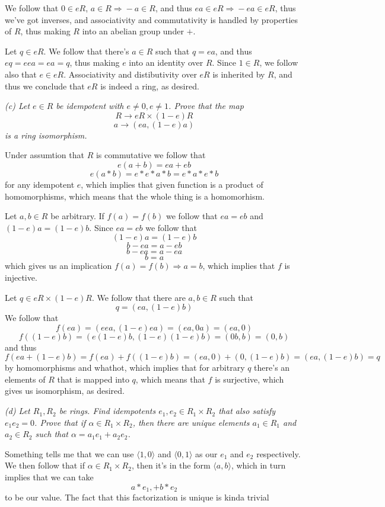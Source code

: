 \documentclass[11pt,oneside,titlepage]{book}
\DeclareMathOperator \ra {\Rightarrow}
\newcommand{\eangle}[1]{\langle #1 \rangle}
\begin{document}
We follow that $0 \in eR$, $a \in R \ra -a \in R$, and thus $ea \in eR
\ra -ea \in eR$, thus we've got inverses, and associativity and
commutativity is handled by properties of $R$, thus making $R$ into an
abelian group under $+$.

Let $q \in eR$. We follow that there's $a \in R$ such that $q = ea$,
and thus $eq = eea = ea = q$, thus making $e$ into an identity over
$R$. Since $1 \in R$, we follow also that $e \in eR$. Associativity
and distibutivity over $eR$ is inherited by $R$, and thus we conclude that
$eR$ is indeed a ring, as desired.

\textit{(c) Let $e \in R$ be idempotent with $e \neq 0, e \neq
1$. Prove that the map
  $$R \to eR \times (1 - e)R$$
  $$a \to (ea, (1 - e)a)$$
  is a ring isomorphism.}

Under assumtion that $R$ is commutative we follow that
$$ e (a + b) = e a + eb $$
$$ e (a * b) = e * e * a * b = e * a * e * b $$
for any idempotent $e$, which implies that given function is a product
of homomorphisms, which means that the whole thing is a homomorhism.

Let $a, b \in R$ be arbitrary.  If $f(a) = f(b)$ we follow that $ea =
eb$ and $(1 - e)a = (1 - e)b$.  Since $ea = eb$ we follow that
$$(1 - e)a = (1 - e)b$$
$$b - ea = a - eb$$
$$b - ea = a - ea$$
$$b = a$$
which gives us an implication $f(a) = f(b) \ra a = b$, which implies
that $f$ is injective.

Let $q \in eR \times (1 - e)R$. We follow that there are $a, b \in R$
such that
$$q = (ea, (1 - e)b)$$
We follow that
$$f(ea) = (eea, (1 - e)ea) = (ea, 0a) = (ea, 0)$$
$$f((1 - e)b) = (e(1 - e)b, (1 - e)(1 - e)b) = (0 b, b) = (0, b)$$
and thus
$$f(ea + (1 - e)b) = f(ea) + f((1 - e)b)
= (ea, 0) + (0, (1 - e)b) = (ea, (1 - e)b) = q$$
by homomorphisms and whathot, which implies that for arbitrary $q$
there's an elements of $R$ that is mapped into $q$, which means that
$f$ is surjective, which gives us isomorphism, as desired.

\textit{(d) Let $R_1, R_2$ be rings. Find idempotents $e_1, e_2 \in
R_1 \times R_2$ that also satisfy $e_1 e_2 = 0$. Prove that if $\alpha
\in R_1 \times R_2$, then there are unique elements $a_1 \in R_1$ and
$a_2 \in R_2$ such that $\alpha = a_1 e_1 + a_2 e_2$.}

Something tells me that we can use $\eangle{1, 0}$ and $\eangle{0, 1}$
as our $e_1$ and $e_2$ respectively. We then follow that if
$\alpha \in R_1 \times R_2$, then it's in the form $\eangle{a,b}$,
which in turn implies that we can take
$$a * e_1, + b * e_2$$
to be our value. The fact that this factorization is unique is kinda trivial
\end{document}
